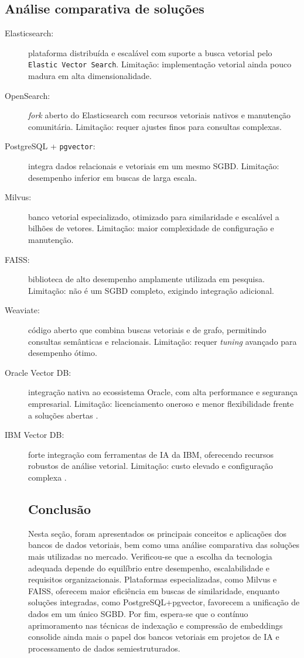 \subsection{Análise comparativa de soluções}
\begin{description}
  \item[Elasticsearch:] plataforma distribuída e escalável com suporte a busca vetorial pelo \texttt{Elastic Vector Search}. Limitação: implementação vetorial ainda pouco madura em alta dimensionalidade.

  \item[OpenSearch:] \emph{fork} aberto do Elasticsearch com recursos vetoriais nativos e manutenção comunitária. Limitação: requer ajustes finos para consultas complexas.

  \item[PostgreSQL + \texttt{pgvector}:] integra dados relacionais e vetoriais em um mesmo SGBD. Limitação: desempenho inferior em buscas de larga escala.

  \item[Milvus:] banco vetorial especializado, otimizado para similaridade e escalável a bilhões de vetores. Limitação: maior complexidade de configuração e manutenção.

  \item[FAISS:] biblioteca de alto desempenho amplamente utilizada em pesquisa. Limitação: não é um SGBD completo, exigindo integração adicional.

  \item[Weaviate:] código aberto que combina buscas vetoriais e de grafo, permitindo consultas semânticas e relacionais. Limitação: requer \emph{tuning} avançado para desempenho ótimo.

  \item[Oracle Vector DB:] integração nativa ao ecossistema Oracle, com alta performance e segurança empresarial. Limitação: licenciamento oneroso e menor flexibilidade frente a soluções abertas \cite{oracle2025vector}.

  \item[IBM Vector DB:] forte integração com ferramentas de IA da IBM, oferecendo recursos robustos de análise vetorial. Limitação: custo elevado e configuração complexa \cite{ibm2025vector}.

  \subsection{Conclusão}
    Nesta seção, foram apresentados os principais conceitos e aplicações dos bancos de dados vetoriais, bem como uma análise comparativa das soluções mais utilizadas no mercado. Verificou-se que a escolha da tecnologia adequada depende do equilíbrio entre desempenho, escalabilidade e requisitos organizacionais. Plataformas especializadas, como Milvus e FAISS, oferecem maior eficiência em buscas de similaridade, enquanto soluções integradas, como PostgreSQL+pgvector, favorecem a unificação de dados em um único SGBD. Por fim, espera-se que o contínuo aprimoramento nas técnicas de indexação e compressão de embeddings consolide ainda mais o papel dos bancos vetoriais em projetos de IA e processamento de dados semiestruturados.



\end{description}
